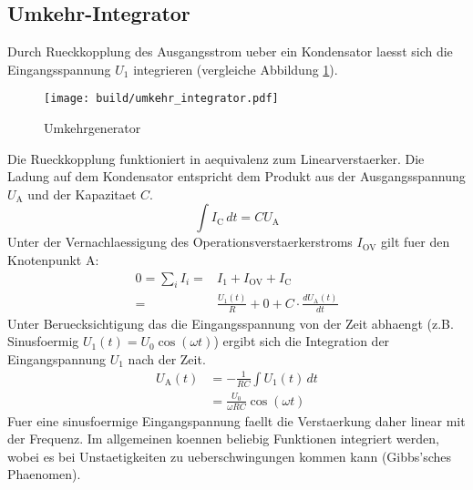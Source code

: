 \subsection{Umkehr-Integrator}%
\label{sub:umkehr_integrator}

Durch Rueckkopplung des Ausgangsstrom ueber ein Kondensator laesst sich die
Eingangsspannung $U_1$ integrieren (vergleiche Abbildung \ref{fig:integrator}).
\begin{figure}[h]
		\centering
		\texttt{[image: build/umkehr\_integrator.pdf]}
		\caption{Umkehrgenerator}
		\label{fig:integrator}
\end{figure}
Die Rueckkopplung funktioniert in aequivalenz zum Linearverstaerker.
Die Ladung auf dem Kondensator entspricht dem Produkt aus der Ausgangsspannung
$U_\text{A}$ und der Kapazitaet $C$.
\begin{equation}
		\int I_\text{C} \, dt = C U_\text{A}
\end{equation}
Unter der Vernachlaessigung des Operationsverstaerkerstroms $I_\text{OV}$ gilt
fuer den Knotenpunkt A:
\begin{align}
		0 = \sum_i I_i =& I_1 + I_\text{OV} + I_\text{C} \\
		=& \frac{U_1(t)}{R} + 0 + C \cdot \frac{d U_\text{A}(t)}{dt}
\end{align}
Unter Beruecksichtigung das die Eingangsspannung von der Zeit abhaengt (z.B.
Sinusfoermig $U_1(t)= U_0 \cos(\omega t)$) ergibt sich die Integration der Eingangspannung $U_1$ nach
der Zeit.
\begin{align}
		U_\text{A}(t) &= - \frac{1}{RC} \int U_\text{1}(t) \, dt \\
				   &= \frac{U_0}{\omega R C} \cos (\omega t)
\end{align}
Fuer eine sinusfoermige Eingangspannung faellt die Verstaerkung daher linear mit 
der Frequenz.
Im allgemeinen koennen beliebig Funktionen integriert werden, wobei es bei
Unstaetigkeiten zu ueberschwingungen kommen kann (Gibbs'sches Phaenomen).

